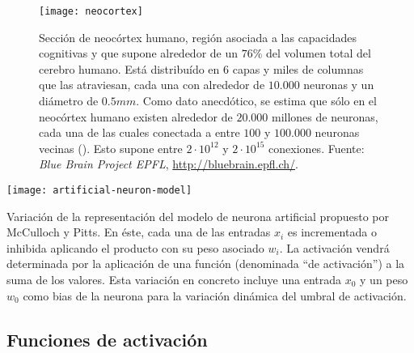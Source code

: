 \begin{figure}[t]
	\centering
	\texttt{[image: neocortex]}
	\caption[Sección de neocórtex humano]{Sección de neocórtex humano, región asociada a las capacidades cognitivas y que supone alrededor de un $76\%$ del volumen total del cerebro humano. Está distribuído en $6$ capas y miles de columnas que las atraviesan, cada una con alrededor de $10.000$ neuronas y un diámetro de $0.5mm$.  Como dato anecdótico, se estima que sólo en el neocórtex humano existen alrededor de $20.000$ millones de neuronas, cada una de las cuales conectada a entre $100$ y $100.000$ neuronas vecinas (\cite{Pakkenberg1997}). Esto supone entre $2 \cdot 10^{12}$ y $2 \cdot 10^{15}$ conexiones. Fuente: \textit{Blue Brain Project EPFL}, \url{http://bluebrain.epfl.ch/}.}
	\label{fig:neocortex}
\end{figure}

\begin{marginfigure}
	\centering
	\texttt{[image: artificial-neuron-model]}
	\caption[Modelo de neurona artificial de McCulloch y Pitts]{Variación de la representación del modelo de neurona artificial propuesto por McCulloch y Pitts. En éste, cada una de las entradas $x_i$ es incrementada o inhibida aplicando el producto con su peso asociado $w_i$. La activación vendrá determinada por la aplicación de una función (denominada \enquote{de activación}) a la suma de los valores. Esta variación en concreto incluye una entrada $x_0$ y un peso $w_0$ como bias de la neurona para la variación dinámica del umbral de activación.}
	\label{fig:mccullocs-pitts-neuron-model}
\end{marginfigure}

\subsection{Funciones de activación}

